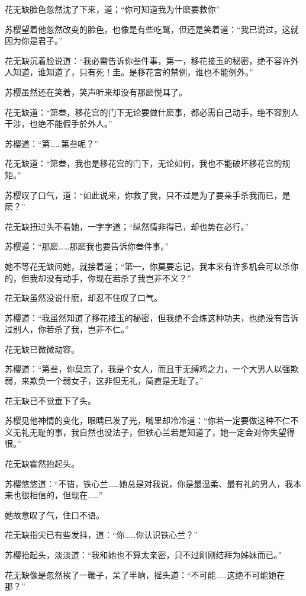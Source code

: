 \documentclass[12pt,oneside]{book}
\begin{document}
花无缺脸色忽然沈了下来，道；``你可知道我为什麽要救你''

苏樱望着他忽然改变的脸色，也像是有些吃鹫，但还是笑着道：``我已说过，这就因为你是君子。''

花无缺沉着脸说道：``我必需告诉你叁件事，第一，移花接玉的秘密，绝不容许外人知道，谁知道了，只有死！圭。是移花宫的禁例，谁也不能例外。''

苏樱虽然还在笑着，笑声听来却没有那麽悦耳了。

花无缺道：``第叁，移花宫的门下无论要做什麽事，都必需自己动手，绝不容别人干涉，也绝不能假手於外人。''

苏樱道：``第\ldots\ldots 第叁呢？''

花无缺道：``第叁，我也是移花宫的门下，无论如何，我也不能破坏移花宫的规矩。''

苏樱叹了口气，道：``如此说来，你救了我，只不过是为了要亲手杀我而已，是麽？''

花无缺扭过头不看她，一字字道；``纵然情非得已，却也势在必行。''

苏樱道：``那麽\ldots\ldots 那麽我也要告诉你叁件事。''

她不等花无缺问她，就接着道；``第一，你莫要忘记，我本来有许多机会可以杀你的，但我却没有动手，你现在若杀了我岂非不义？''

花无缺虽然没说什麽，却忍不住叹了口气。

苏樱道：``我虽然知道了移花接玉的秘密，但我绝不会练这种功夫，也绝没有告诉过别人，你若杀了我，岂非不仁。''

花无缺已微微动容。

苏樱道：``第叁，你莫忘了，我是个女人，而且手无缚鸡之力，一个大男人以强欺弱，来欺负一个弱女子，这非但无礼，简直是无耻了。''

花无缺已不觉垂下了头。

苏樱见他神情的变化，眼睛已发了光，嘴里却冷冷道：``你若一定要做这种不仁不义无礼无耻的事，我自然也没法子，但铁心兰若是知道了，她一定会对你失望得很。''

花无缺霍然抬起头。

苏樱悠悠道：``不错，铁心兰\ldots\ldots 她总是对我说，你是最温柔、最有礼的男人，我本来也很相信的，但现在\ldots\ldots{}''

她故意叹了气，住口不语。

花无缺指尖已有些发抖，道：``你\ldots\ldots 你认识铁心兰？''

苏樱抬起头，淡淡道：``我和她也不算太亲密，只不过刚刚结拜为姊妹而已。''

花无缺像是忽然挨了一鞭子，呆了半晌，摇头道：``不可能\ldots\ldots 这绝不可能她在那？''
\end{document}
